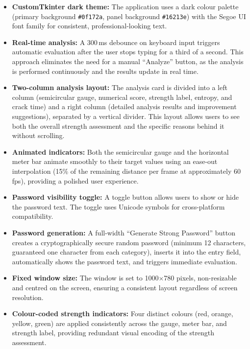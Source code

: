 \begin{itemize}
    \item \textbf{CustomTkinter dark theme:} The application uses a dark colour palette (primary background \texttt{\#0f172a}, panel background \texttt{\#16213e}) with the Segoe UI font family for consistent, professional-looking text.

    \item \textbf{Real-time analysis:} A 300\,ms debounce on keyboard input triggers automatic evaluation after the user stops typing for a third of a second. This approach eliminates the need for a manual ``Analyze'' button, as the analysis is performed continuously and the results update in real time.

    \item \textbf{Two-column analysis layout:} The analysis card is divided into a left column (semicircular gauge, numerical score, strength label, entropy, and crack time) and a right column (detailed analysis results and improvement suggestions), separated by a vertical divider. This layout allows users to see both the overall strength assessment and the specific reasons behind it without scrolling.

    \item \textbf{Animated indicators:} Both the semicircular gauge and the horizontal meter bar animate smoothly to their target values using an ease-out interpolation (15\% of the remaining distance per frame at approximately 60\,fps), providing a polished user experience.

    \item \textbf{Password visibility toggle:} A toggle button allows users to show or hide the password text. The toggle uses Unicode symbols for cross-platform compatibility.

    \item \textbf{Password generation:} A full-width ``Generate Strong Password'' button creates a cryptographically secure random password (minimum 12 characters, guaranteed one character from each category), inserts it into the entry field, automatically shows the password text, and triggers immediate evaluation.

    \item \textbf{Fixed window size:} The window is set to 1000$\times$780 pixels, non-resizable and centred on the screen, ensuring a consistent layout regardless of screen resolution.

    \item \textbf{Colour-coded strength indicators:} Four distinct colours (red, orange, yellow, green) are applied consistently across the gauge, meter bar, and strength label, providing redundant visual encoding of the strength assessment.
\end{itemize}

